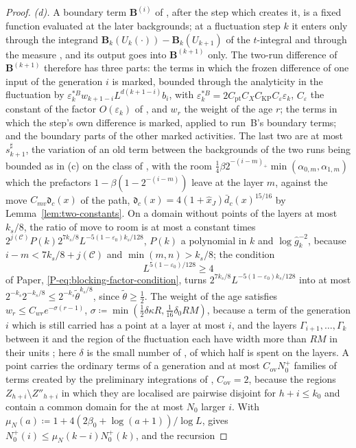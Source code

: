 \documentclass[11pt]{preprint}
\numberwithin{equation}{section}
\theoremstyle{definition}
\theoremstyle{remark}
\theoremstyle{plain}
\begin{document}
\begin{proof}
\emph{(d).} A boundary term $\mathbf B^{(i)}$ of \cite[(2.40)--(2.42), p.~261]{BalabanCRE}, after the step which creates it, is a fixed function evaluated at the later backgrounds; at a fluctuation step $k$ it enters \cite[(3.26)]{BalabanCRE} only through the integrand $\mathbf B_k(U_k(\cdot)) - \mathbf B_k(U_{k+1})$ of the $t$-integral and through the measure \cite[(3.27), p.~271]{BalabanCRE}, and its output goes into $\mathbf B^{(k+1)}$ only. The two-run difference of $\mathbf B^{(k+1)}$ therefore has three parts: the terms in which the frozen difference of one input of the generation $i$ is marked, bounded through the analyticity in the fluctuation by $\varepsilon^{*B}_kw_{k+1-i}L^{d(k+1-i)}b_i$, with $\varepsilon^{*B}_k = 2C_{\mathrm{pt}}C_XC_{\mathrm{KP}}C_\varepsilon\varepsilon_k$, $C_\varepsilon$ the constant of the factor $O(\varepsilon_k)$ of \cite[p.~277, ll.~7--9]{BalabanCRE}, and $w_r$ the weight of the age $r$; the terms in which the step's own difference is marked, applied to run~B's boundary terms; and the boundary parts of the other marked activities. The last two are at most $s^\sharp_{k+1}$, the variation of an old term between the backgrounds of the two runs being bounded as in (c) on the class of \cite[(2.34)--(2.39), p.~261]{BalabanCRE}, with the room $\frac14\beta2^{-(i-m)_+}\min(\alpha_{0,m}, \alpha_{1,m})$ which the prefactors $1 - \beta(1 - 2^{-(i-m)})$ leave at the layer $m$, against the move $C_{mv}\mathfrak d_c(x)$ of the path, $\mathfrak d_c(x) = 4(1 + \hat x_J)\bar d_c(x)^{15/16}$ by Lemma~\ref{lem:two-constants}. On a domain without points of the layers at most $k_s/8$, the ratio of move to room is at most a constant times $2^{j(\mathcal C)}P(k)2^{7k_s/8}L^{-5(1-\varepsilon_0)k_s/128}$, $P(k)$ a polynomial in $k$ and $\log\hat g_k^{-2}$, because $i - m < 7k_s/8 + j(\mathcal C)$ and $\min(m, n) > k_s/8$; the condition
\begin{equation}\label{eq:lv-condition}
    L^{5(1-\varepsilon_0)/128} \geq 4
\end{equation}
of Paper, \eqref{P-eq:blocking-factor-condition}, turns $2^{7k_s/8}L^{-5(1-\varepsilon_0)k_s/128}$ into at most $2^{-k_s}2^{-k_s/8} \leq 2^{-k_s}\tilde\theta^{k_s/8}$, since $\tilde\theta \geq \frac12$. The weight of the age satisfies $w_r \leq C_{wr}e^{-\sigma(r-1)}$, $\sigma \coloneqq \min(\frac12\delta\kappa R, \frac1{16}\delta_0RM)$, because a term of the generation $i$ which is still carried has a point at a layer at most $i$, and the layers $\Gamma_{i+1}, \dots, \Gamma_k$ between it and the region of the fluctuation each have width more than $RM$ in their units \cite[(2.2), p.~224]{BalabanPRT2}; here $\delta$ is the small number of \cite[p.~272, ll.~2--4]{BalabanRG1}, of which half is spent on the layers. A point carries the ordinary terms of a generation and at most $C_{\mathrm{ov}}N^+_0$ families of terms created by the preliminary integrations of \cite[(1.60)--(1.63), p.~189]{BalabanLFR1}, $C_{\mathrm{ov}} = 2$, because the regions $Z_{h+i} \setminus Z''_{h+i}$ in which they are localised are pairwise disjoint for $h + i \leq k_0$ and contain a common domain for the at most $N_0$ larger $i$. With $\mu_N(a) \coloneqq 1 + 4(2\beta_0 + \log(a + 1))/\log L$, \cite[(2.6)]{BalabanCRE} gives $N^+_0(i) \leq \mu_N(k - i)N^+_0(k)$, and the recursion

\end{proof}
\end{document}
